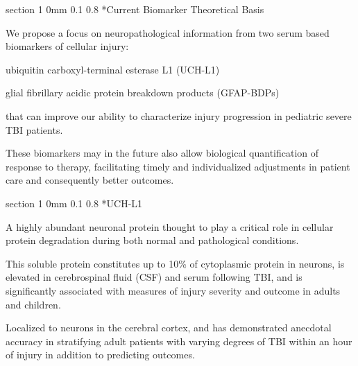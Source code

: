 \documentclass[12pt]{article}
\makeatletter
\newcommand{\9}{\\[9pt]}
\renewcommand{\section}{\@startsection
	    {section}%
	    {1}%
	    {0mm}%
	    {0.1\baselineskip}%
	    {0.8\baselineskip}%
	    {\newpage \color[cmyk]{0.43,0,0.01,0} \center\LARGE}}%
\makeatother
\begin{document}
\begin{landscape}
\begin{Large}
{\section*{Current Biomarker Theoretical Basis}
\begin{ohlist}
    \item   We propose a focus on neuropathological information from two serum based biomarkers of cellular injury: 
            \begin{ohlist2}
                \item   \textcolor{MyEmph}{ubiquitin carboxyl-terminal esterase L1} (UCH-L1) 
                \item   \textcolor{MyEmph}{glial fibrillary acidic protein} breakdown products (GFAP-BDPs) 
            \end{ohlist2}
            that can improve our ability to characterize injury progression in pediatric severe TBI patients. 
    \item   These biomarkers may in the future also allow biological quantification of response to therapy, facilitating timely and 
            individualized adjustments in patient care and consequently better outcomes.
\end{ohlist}

\section*{UCH-L1}
\begin{ohlist}
    \item   A highly abundant neuronal protein thought to play a critical role in cellular protein degradation during both normal and 
            pathological conditions. 
    \item   This soluble protein constitutes up to 10\% of cytoplasmic protein in neurons, is elevated in cerebrospinal fluid (CSF) 
            and serum following TBI, and is significantly associated with measures of injury severity and outcome in adults and 
            children. 
    \item   Localized to neurons in the cerebral cortex, and has demonstrated anecdotal accuracy in stratifying adult patients 
            with varying degrees of TBI within an hour of injury in addition to predicting outcomes.
\end{ohlist}

}
\end{Large}
\end{landscape}
\end{document}
